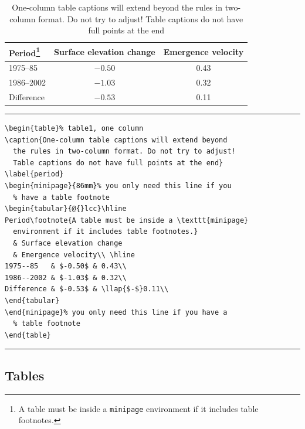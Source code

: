 \documentclass[twocolumn]{igs}
\begin{document}
\begin{table}%
\caption{One-column table captions will extend beyond
  the rules in two-column format. Do not try to adjust!
  Table captions do not have full points at the end}
\label{period}
\begin{minipage}{86mm}%
\begin{tabular}{@{}lcc}\hline
Period\footnote{A table must be inside a \texttt{minipage}
  environment if it includes table footnotes.}
  & Surface elevation change
  & Emergence velocity\\ \hline
1975--85   & $-0.50$ & 0.43\\
1986--2002 & $-1.03$ & 0.32\\
Difference & $-0.53$ & \llap{$-$}0.11\\
\end{tabular}
\end{minipage}%
\vspace\baselineskip\hrule %
\vspace\baselineskip
\begin{verbatim}
\begin{table}% table1, one column
\caption{One-column table captions will extend beyond
  the rules in two-column format. Do not try to adjust!
  Table captions do not have full points at the end}
\label{period}
\begin{minipage}{86mm}% you only need this line if you
  % have a table footnote
\begin{tabular}{@{}lcc}\hline
Period\footnote{A table must be inside a \texttt{minipage}
  environment if it includes table footnotes.}
  & Surface elevation change
  & Emergence velocity\\ \hline
1975--85   & $-0.50$ & 0.43\\
1986--2002 & $-1.03$ & 0.32\\
Difference & $-0.53$ & \llap{$-$}0.11\\
\end{tabular}
\end{minipage}% you only need this line if you have a
  % table footnote
\end{table}
\end{verbatim}
\vspace\baselineskip\hrule %
\end{table}

\subsection{Tables}
\end{document}
